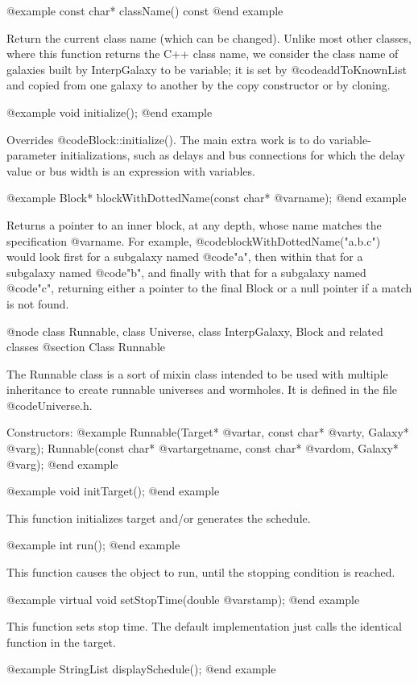 @example
const char* className() const
@end example

Return the current class name (which can be changed).  Unlike most
other classes, where this function returns the C++ class name, we
consider the class name of galaxies built by InterpGalaxy to be
variable; it is set by @code{addToKnownList} and copied from one
galaxy to another by the copy constructor or by cloning.

@example
void initialize();
@end example

Overrides @code{Block::initialize()}.  The main extra work is to do
variable-parameter initializations, such as delays and bus connections
for which the delay value or bus width is an expression with variables.

@example
Block* blockWithDottedName(const char* @var{name});
@end example

Returns a pointer to an inner block, at any depth, whose name matches
the specification @var{name}.  For example, @code{blockWithDottedName("a.b.c")}
would look first for a subgalaxy named @code{"a"}, then within that
for a subgalaxy named @code{"b"}, and finally with that for a subgalaxy
named @code{"c"}, returning either a pointer to the final Block or a
null pointer if a match is not found.

@node class Runnable, class Universe, class InterpGalaxy, Block and related classes
@section Class Runnable

The Runnable class is a sort of mixin class intended to be used with
multiple inheritance to create runnable universes and wormholes.  It
is defined in the file @code{Universe.h}.

Constructors:
@example
Runnable(Target* @var{tar}, const char* @var{ty}, Galaxy* @var{g});
Runnable(const char* @var{targetname}, const char* @var{dom}, Galaxy* @var{g});
@end example

@example
void initTarget();
@end example

This function initializes target and/or generates the schedule.

@example
int run();
@end example

This function causes the object to run, until the stopping condition is reached.

@example
virtual void setStopTime(double @var{stamp});
@end example

This function sets stop time.  The default implementation just
calls the identical function in the target.

@example
StringList displaySchedule();
@end example

